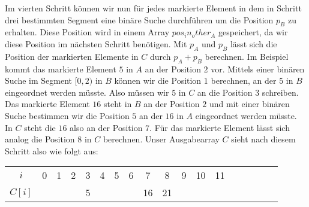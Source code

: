 Im vierten Schritt können wir nun für jedes markierte Element in dem in Schritt drei bestimmten Segment eine binäre Suche durchführen um die Position $p_B$ zu erhalten. Diese Position wird in einem Array $pos_in_other_A$ gespeichert, da wir diese Position im nächsten Schritt benötigen. Mit $p_A$ und $p_B$ lässt sich die Position der markierten Elemente in $C$ durch $p_A+p_B$ berechnen. 
Im Beispiel kommt das markierte Element $5$ in $A$ an der Position $2$ vor. Mittels einer binären Suche im Segment $[0,2)$ in $B$ können wir die Position $1$ berechnen, an der $5$ in $B$ eingeordnet werden müsste. Also müssen wir $5$ in $C$ an die Position $3$ schreiben. Das markierte Element $16$ steht in $B$ an der Position $2$ und mit einer binären Suche bestimmen wir die Position $5$ an der $16$ in $A$ eingeordnet werden müsste. In $C$ steht die $16$ also an der Position $7$. Für das markierte Element lässt sich analog die Position $8$ in $C$ berechnen. Unser Ausgabearray $C$ sieht nach diesem Schritt also wie folgt aus:

\begin{table}[H]
	\small
	\centering
	\begin{tabular}{c| c c c c c c c c c c c c c c c c c}
		$i$ & 0 & 1 & 2 & 3 & 4 & 5 & 6 & 7 & 8 & 9 & 10 & 11 \\
		$C[i]$ & & & & 5 & & & & 16 & 21 & & & & \\
	\end{tabular}
\end{table}


